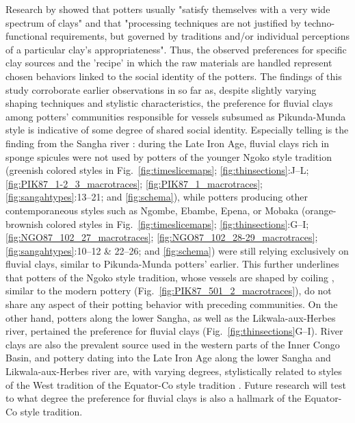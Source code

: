 \documentclass[smallextended,natbib]{svjour3}       %
\begin{document}
Research by \citet[148]{Gosselain.1997} showed that potters usually "satisfy themselves with a very wide spectrum of clays" and that "processing techniques are not justified by techno-functional requirements, but governed by traditions and/or individual perceptions of a particular clay's appropriateness". Thus, the observed preferences for specific clay sources and the 'recipe' in which the raw materials are handled represent chosen behaviors linked to the social identity of the potters. The findings of this study corroborate earlier observations \citep[123--124]{Seidensticker.2016b} in so far as, despite slightly varying shaping techniques and stylistic characteristics, the preference for fluvial clays among potters' communities responsible for vessels subsumed as Pikunda-Munda style is indicative of some degree of shared social identity. Especially telling is the finding from the Sangha river \citep{Seidensticker.2020}: during the Late Iron Age, fluvial clays rich in sponge spicules were not used by potters of the younger Ngoko style tradition (greenish colored styles in Fig.~\ref{fig:timeslicemaps}; \ref{fig:thinsections}:J--L; \ref{fig:PIK87_1-2_3_macrotraces}; \ref{fig:PIK87_1_macrotraces}; \ref{fig:sangahtypes}:13--21; and \ref{fig:schema}), while potters producing other contemporaneous styles such as Ngombe, Ebambe, Epena, or Mobaka (orange-brownish colored styles in Fig.~\ref{fig:timeslicemaps}; \ref{fig:thinsections}:G--I; \ref{fig:NGO87_102_27_macrotraces}; \ref{fig:NGO87_102_28-29_macrotraces}; \ref{fig:sangahtypes}:10--12 \& 22--26; and \ref{fig:schema}) were still relying exclusively on fluvial clays, similar to Pikunda-Munda potters' earlier. This further underlines that potters of the Ngoko style tradition, whose vessels are shaped by coiling \citep[Figs.~\ref{fig:PIK87_1-2_3_macrotraces} and \ref{fig:PIK87_1_macrotraces};][53--54 Fig.~16B, 72 Tab.~13]{Seidensticker.2021e}, similar to the modern pottery (Fig.~\ref{fig:PIK87_501_2_macrotraces}), do not share any aspect of their potting behavior with preceding communities. On the other hand, potters along the lower Sangha, as well as the Likwala-aux-Herbes river, pertained the preference for fluvial clays (Fig.~\ref{fig:thinsections}G--I). River clays are also the prevalent source used in the western parts of the Inner Congo Basin, and pottery dating into the Late Iron Age along the lower Sangha and Likwala-aux-Herbes river are, with varying degrees, stylistically related to styles of the West tradition of the Equator-Co style tradition \citep[221--222 Fig.~4]{Wotzka.1995}. Future research will test to what degree the preference for fluvial clays is also a hallmark of the Equator-Co style tradition.
\end{document}
